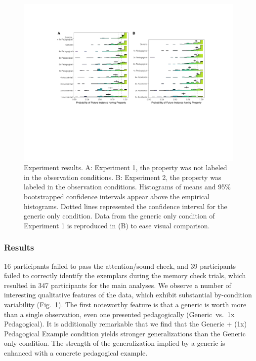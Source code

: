 \documentclass[10pt,letterpaper]{article}
\begin{document}



\begin{figure}[t]
\begin{center}
\includegraphics[width=\linewidth]{figs/genex_expts_ridges.pdf}
\end{center}
\caption{Experiment results.  A: Experiment 1, the property was not labeled in the observation conditions. B: Experiment 2, the property was labeled in the observation conditions. Histograms of means and 95\% bootstrapped confidence intervals appear above the empirical histograms. Dotted lines represented the confidence interval for the generic only condition. Data from the generic only condition of Experiment 1 is reproduced in (B) to ease visual comparison. }
\label{fig:results}
\end{figure}



\subsubsection{Results}

16 participants failed to pass the attention/sound check, and 39 participants failed to correctly identify the exemplars during the memory check trials, which resulted in 347 participants for the main analyses.
We observe a number of interesting qualitative features of the data, which exhibit substantial by-condition variability (Fig.~\ref{fig:results}). 
The first noteworthy feature is that a generic is worth more than a single observation, even one presented pedagogically (Generic~vs.~1x Pedagogical). 
It is additionally remarkable that we find that the Generic + (1x) Pedagogical Example condition yields stronger generalizations than the Generic only condition. 
The strength of the generalization implied by a generic is enhanced with a concrete pedagogical example. 
\end{document}
